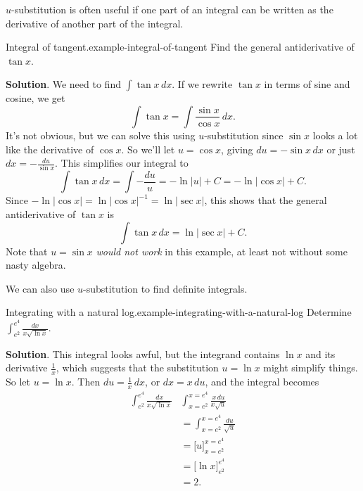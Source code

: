 \documentclass[10pt,]{book}
\numberwithin{equation}{section}
\begin{document}
\hypertarget{p-485}{}%
\(u\)-substitution is often useful if one part of an integral can be written as the derivative of another part of the integral.%
\begin{example}{Integral of tangent.}{example-integral-of-tangent}%
\hypertarget{p-486}{}%
Find the general antiderivative of \(\tan x\).%
\par\smallskip%
\noindent\textbf{Solution}.\hypertarget{solution-107}{}\quad%
\hypertarget{p-487}{}%
We need to find \(\int\tan x\,dx\). If we rewrite \(\tan x\) in terms of sine and cosine, we get%
\begin{equation*}
\int\tan x = \int\frac{\sin x}{\cos x}\,dx.
\end{equation*}
It's not obvious, but we can solve this using \(u\)-substitution since \(\sin x\) looks a lot like the derivative of \(\cos x\). So we'll let \(u = \cos x\), giving \(du = -\sin x\,dx\) or just \(dx = -\frac{du}{\sin x}\). This simplifies our integral to%
\begin{equation*}
\int\tan x\,dx = \int-\frac{du}{u} = -\ln|u| + C = -\ln|\cos x|+C.
\end{equation*}
Since \(-\ln|\cos x| = \ln|\cos x|^{-1} = \ln|\sec x|\), this shows that the general antiderivative of \(\tan x\) is%
\begin{equation*}
\int \tan x\,dx = \ln|\sec x| + C.
\end{equation*}
Note that \(u = \sin x\) \emph{would not work} in this example, at least not without some nasty algebra.%
\end{example}
\hypertarget{p-488}{}%
We can also use \(u\)-substitution to find definite integrals.%
\begin{example}{Integrating with a natural log.}{example-integrating-with-a-natural-log}%
\hypertarget{p-489}{}%
Determine \(\int_{e^{2}}^{e^{4}}\frac{dx}{x\sqrt{\ln x}}\).%
\par\smallskip%
\noindent\textbf{Solution}.\hypertarget{solution-108}{}\quad%
\hypertarget{p-490}{}%
This integral looks awful, but the integrand contains \(\ln x\) and its derivative \(\frac{1}{x}\), which suggests that the substitution \(u = \ln x\) might simplify things. So let \(u = \ln x\). Then \(du = \frac{1}{x}\,dx\), or \(dx = x\,du\), and the integral becomes%
\begin{align*}
\int_{e^{2}}^{e^{4}}\frac{dx}{x\sqrt{\ln x}} & \int_{x=e^{2}}^{x=e^{4}}\frac{x\,du}{x\sqrt{u}} \\
& = \int_{x=e^{2}}^{x=e^{4}}\frac{du}{\sqrt{u}} \\
& = \Big[u\Big]_{x=e^{2}}^{x=e^{4}} \\
& = \Big[\ln x\Big]_{e^{2}}^{e^{4}} \\
& = 2. 
\end{align*}
%
\end{example}
\end{document}
